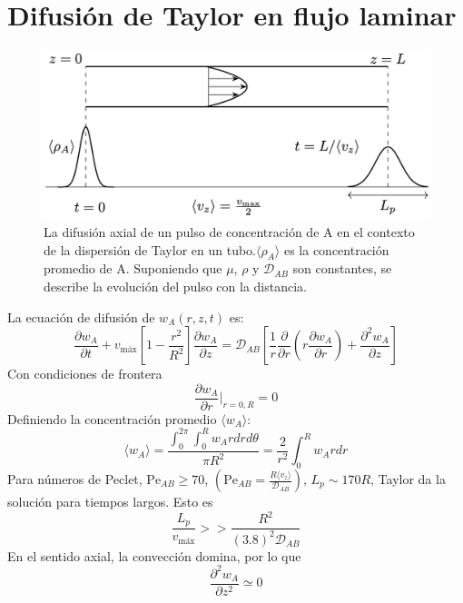 \section{Difusión de Taylor en flujo laminar}
\begin{figure}[h]
    \centering
    \includegraphics[width=\linewidth]{Capitulo3/Imagenes/Fig_3.4.png}
    \caption{La difusión axial de un pulso de concentración de A en el contexto de la dispersión de Taylor en un tubo.$\langle\rho_A\rangle$ es la concentración promedio de A. Suponiendo que $\mu$, $\rho$ y $\mathscr{D}_{AB}$ son constantes, se describe la evolución del pulso con la distancia.}
    \label{fig:Fig_3.4}
\end{figure}
La ecuación de difusión de $w_A(r,z,t)$ es:
\begin{equation}
    \frac{\partial w_A}{\partial t}+v_{\text{máx}}\left[1-\frac{r^2}{R^2}\right]\frac{\partial w_A}{\partial z}=\mathscr{D}_{AB}\left[\frac{1}{r}\frac{\partial}{\partial r}\left( r \frac{\partial w_A}{\partial r}\right)+\frac{\partial^2w_A}{\partial z}\right]
    \label{eq_3.47}
\end{equation}
Con condiciones de frontera
\begin{equation}
\frac{\partial w_A}{\partial r}\Bigg|_{r=0,R}=0
\label{eq_3.48}
\end{equation}
Definiendo la concentración promedio $\langle w_A\rangle$:
\begin{equation}
    \langle w_A\rangle=\frac{\int^{2\pi}_0\int^R_0w_Ardrd\theta}{\pi R^2}=\frac{2}{r^2}\int^R_0w_Ardr
\end{equation}
Para números de Peclet, $\text{Pe}_{AB}\ge 70$, $\left( \text{Pe}_{AB}=\frac{R\langle v_z \rangle}{\mathscr{D}_{AB}}\right)$, $L_p \sim 170R$, Taylor da la solución para tiempos largos. Esto es
    \[
    \frac{L_p}{v_{\text{máx}}}>>\frac{R^2}{(3.8)^2\mathscr{D}_{AB}}
    \]
En el sentido axial, la convección domina, por lo que 
\begin{equation}
    \frac{\partial^2w_A}{\partial z^2}\simeq 0
    \label{eq_3.50}
\end{equation}


